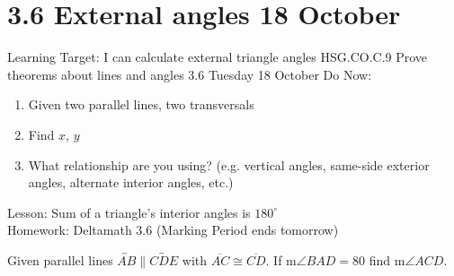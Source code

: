 \section{3.6 External angles \hfill 18 October}
\begin{frame}{Learning Target: I can calculate external triangle angles}
  {HSG.CO.C.9 Prove theorems about lines and angles  \hfill \alert{3.6 Tuesday 18 October}}
  Do Now: 
  \begin{multicols}{2}
    \begin{enumerate}
      \item Given two parallel lines, two transversals
      \item Find $x$, $y$
      \item What relationship are you using? (e.g. vertical angles, same-side exterior angles, alternate interior angles, etc.)
    \end{enumerate}
  \end{multicols}
  Lesson: Sum of a triangle's interior angles is $180^\circ$ \\[0.25cm]
  Homework: Deltamath 3.6 (Marking Period ends tomorrow)
\end{frame}


\begin{frame}
    Given parallel lines $\overleftrightarrow{AB} \parallel \overleftrightarrow{CDE}$ with $\overline{AC} \cong \overline{CD}$. If m$\angle BAD=80$ find m$\angle ACD$.
  \begin{flushright}
  \end{flushright} \vspace{1cm}
  \end{frame}

